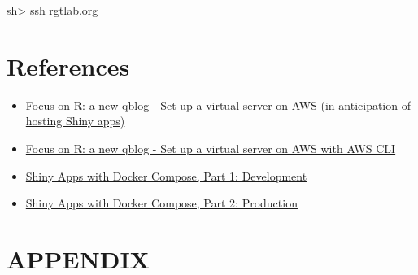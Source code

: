 \documentclass[
  letterpaper,
  DIV=11,
  numbers=noendperiod,
  oneside]{scrartcl}
\newenvironment{Shaded}{\begin{snugshade}}{\end{snugshade}}
\newcommand{\FunctionTok}[1]{\textcolor[rgb]{0.28,0.35,0.67}{#1}}
\newcommand{\NormalTok}[1]{\textcolor[rgb]{0.00,0.23,0.31}{#1}}
\newcommand{\OperatorTok}[1]{\textcolor[rgb]{0.37,0.37,0.37}{#1}}
\providecommand{\tightlist}{%
  \setlength{\itemsep}{0pt}\setlength{\parskip}{0pt}}\usepackage{longtable,booktabs,array}
\begin{document}
\begin{Shaded}
\begin{Highlighting}[]
\FunctionTok{sh}\OperatorTok{\textgreater{}}\NormalTok{ ssh rgtlab.org }
\end{Highlighting}
\end{Shaded}

\hypertarget{references}{%
\section{References}\label{references}}

\begin{itemize}
\tightlist
\item
  \href{https://focusonr.org/posts/server_setup_aws_console/}{Focus on
  R: a new qblog - Set up a virtual server on AWS (in anticipation of
  hosting Shiny apps)}
\item
  \href{https://focusonr.org/posts/server_setup_aws_cli/}{Focus on R: a
  new qblog - Set up a virtual server on AWS with AWS CLI}
\item
  \href{https://hosting.analythium.io/shiny-apps-with-docker-compose-part-1-development/}{Shiny
  Apps with Docker Compose, Part 1: Development}
\item
  \href{https://hosting.analythium.io/shiny-apps-with-docker-compose-part-2-production/}{Shiny
  Apps with Docker Compose, Part 2: Production}
\end{itemize}

\hypertarget{appendix}{%
\section{APPENDIX}\label{appendix}}
\end{document}
